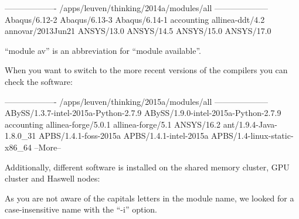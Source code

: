 \begin{prompt}
------------------- /apps/leuven/thinking/2014a/modules/all --------------------
Abaqus/6.12-2
Abaqus/6.13-3
Abaqus/6.14-1
accounting
allinea-ddt/4.2
annovar/2013Jun21
ANSYS/13.0
ANSYS/14.5
ANSYS/15.0
ANSYS/17.0
\end{prompt}

``module av'' is an abbreviation for ``module available''.

When you want to switch to the more recent versions of the compilers you can check the software:

\begin{prompt}
------------------- /apps/leuven/thinking/2015a/modules/all --------------------
ABySS/1.3.7-intel-2015a-Python-2.7.9
ABySS/1.9.0-intel-2015a-Python-2.7.9
accounting
allinea-forge/5.0.1
allinea-forge/5.1
ANSYS/16.2
ant/1.9.4-Java-1.8.0_31
APBS/1.4.1-foss-2015a
APBS/1.4.1-intel-2015a
APBS/1.4-linux-static-x86_64
--More--
\end{prompt}

Additionally, different software is installed on the shared memory cluster, GPU cluster and Haswell nodes:


As you are not aware of the capitals letters in the module name, we looked for a case-insensitive name with the ``-i'' option.
